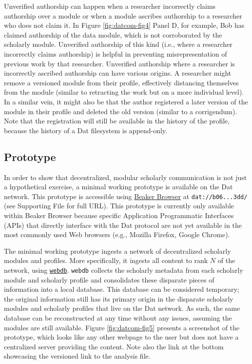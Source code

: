 \documentclass[publications,article,submit,moreauthors,pdftex,10pt,a4paper]{Definitions/mdpi}
\begin{document}
Unverified authorship can happen when a researcher incorrectly claims
authorship over a module or when a module ascribes authorship to a
researcher who does not claim it. In Figure \ref{fig:datcom-fig4} Panel
D, for example, Bob has claimed authorship of the data module, which is
not corroborated by the scholarly module. Unverified authorship of this
kind (i.e., where a researcher incorrectly claims authorship) is helpful
in preventing misrepresentation of previous work by that researcher.
Unverified authorship where a researcher is incorrectly ascribed
authorship can have various origins. A researcher might remove a
versioned module from their profile, effectively distancing themselves
from the module (similar to retracting the work but on a more individual
level). In a similar vein, it might also be that the author registered a
later version of the module in their profile and deleted the old version
(similar to a corrigendum). Note that the registration will still be
available in the history of the profile, because the history of a Dat
filesystem is append-only.

\subsection*{Prototype}\label{prototype}

In order to show that decentralized, modular scholarly communication is
not just a hypothetical exercise, a minimal working prototype is
available on the Dat network. This prototype is accessible using
\href{https://beakerbrowser.com}{Beaker Browser} at
\texttt{dat://b06...3dd/} (see Supporting File for full URL). This
prototype is currently only available within Beaker Browser because
specific Application Programmatic Interfaces (APIs) that directly
interface with the Dat protocol are not yet available in the most
commonly used Web browsers (e.g., Mozilla Firefox, Google Chrome).

The minimal working prototype ingests a network of decentralized
scholarly modules and profiles. More specifically, it ingests all
content to rank \(N\) of the network, using
\href{https://github.com/beakerbrowser/webdb}{\texttt{webdb}}.
\texttt{webdb} collects the scholarly metadata from each scholarly
module and scholarly profile and consolidates these disparate pieces of
information into a local database. This database can be considered
temporary; the original information still has its primary origin in the
disparate scholarly modules and scholarly profiles that live on the Dat
network. As such, the same database can be reconstructed at any time
without any issues, assuming the modules are still available. Figure
\ref{fig:datcom-fig5} presents a screenshot of the prototype, which
looks like any other webpage to the user but does not have a centralized
server providing the content. Note also the link at the bottom
showcasing the versioned link to the analysis file.
\end{document}
